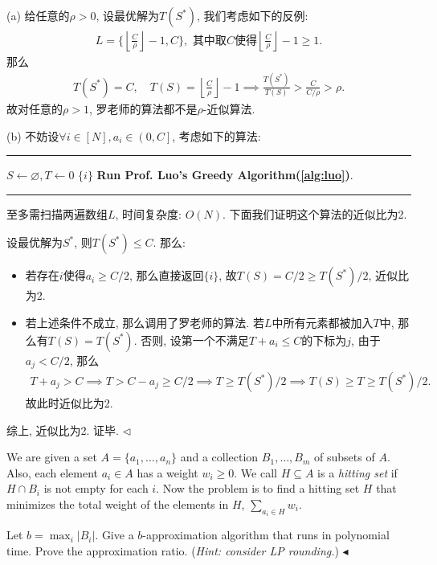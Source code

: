 \documentclass[11pt]{article}
\makeatletter
\newenvironment{problem}[2][Problem]{\begin{trivlist}
    \item[\hskip \labelsep{\bfseries#1}\hskip\labelsep{\bfseries#2.}]\mbox{}\newline}{\hfill$\blacktriangleleft$\end{trivlist}}
\newenvironment{answer}[1][Solution]{\begin{trivlist}
\item[\hskip \labelsep{\bfseries#1.}\hskip \labelsep]}{\hfill$\lhd$\end{trivlist}}
\newenvironment{algo}
  {%
    \begin{center}
      \refstepcounter{algorithm}%
      \hrule height.8pt depth0pt \kern2pt%
      \parskip 0pt
      \renewcommand{\caption}[2][\relax]{%
        {\raggedright\textbf{\fname@algorithm~\thealgorithm} ##2\par}%
        \ifx\relax##1\relax %
          \addcontentsline{loa}{algorithm}{\protect\numberline{\thealgorithm}##2}%
        \else %
          \addcontentsline{loa}{algorithm}{\protect\numberline{\thealgorithm}##1}%
        \fi
        \kern2pt\hrule\kern2pt
     }
  }
  {%
     \kern2pt\hrule\relax%
   \end{center}
  }
\makeatother
\begin{document}
\begin{answer}
    (a) 给任意的$\rho > 0$, 设最优解为$T(S^*)$, 我们考虑如下的反例:
    \begin{align*}
        L = \bigg\{\left\lfloor\frac{C}{\rho}\right\rfloor - 1, C\bigg\}, \text{ 其中取$C$使得} \left\lfloor\frac{C}{\rho}\right\rfloor - 1 \ge 1.
    \end{align*}
    那么
    \begin{align*}
        T(S^*) = C, \quad T(S) = \left\lfloor\frac{C}{\rho}\right\rfloor - 1 \implies \frac{T(S^*)}{T(S)} > \frac{C}{C/\rho} > \rho.
    \end{align*}
    故对任意的$\rho > 1$, 罗老师的算法都不是$\rho$-近似算法.

    (b) 不妨设$\forall i \in [N], a_i \in \left(0,C\right]$, 考虑如下的算法:
    \begin{algo}
        \begin{algorithmic}[1]
            \State $S \leftarrow \varnothing, T \leftarrow 0$
                    \State \Return $\{i\}$
                \EndIf
            \EndFor
            \State \textbf{Run Prof. Luo's Greedy Algorithm(\ref{alg:luo})}.
        \end{algorithmic}
    \end{algo}
    至多需扫描两遍数组$L$, 时间复杂度: $O(N)$. 下面我们证明这个算法的近似比为2.
    
    设最优解为$S^*$, 则$T(S^*) \le C$. 那么:
    \begin{itemize}
        \item 若存在$i$使得$a_i \ge C/2$, 那么直接返回$\{i\}$, 故$T(S) = C/2 \ge T(S^*)/2$, 近似比为2.
        \item 若上述条件不成立, 那么调用了罗老师的算法. 若$L$中所有元素都被加入$T$中, 那么有$T(S) = T(S^*)$. 否则, 设第一个不满足$T + a_i \le C$的下标为$j$, 由于$a_j < C/2$, 那么
        \begin{align*}
            T + a_j > C \implies T > C - a_j \ge C/2 \implies T \ge T(S^*)/2  \implies T(S) \ge T \ge T(S^*)/2.
        \end{align*}
        故此时近似比为2.
    \end{itemize} 
    综上, 近似比为2. 证毕.
\end{answer}

\begin{problem}{3. (Hitting Set)}
    We are given a set $A=\{a_1,\ldots,a_n\}$ and a collection $B_1,\ldots,B_m$ of subsets of $A$. Also, each element $a_i \in A$ has a weight $w_i \geq 0$. We call $H \subseteq A$ is a \textit{hitting set} if $H\cap B_i$ is not empty for each $i$. Now the problem is to find a hitting set $H$ that minimizes the total weight of the elements in $H$, $\sum_{a_i \in H}w_i$.

    Let $b=\max_i|B_i|$. Give a $b$-approximation algorithm that runs in polynomial time. Prove the approximation ratio. (\textit{Hint: consider LP rounding.})
\end{problem}
\end{document}
